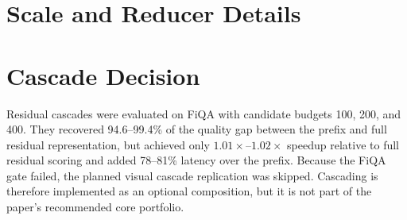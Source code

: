 \documentclass{article}
\begin{document}
\section{Scale and Reducer Details}

\begin{center}
\label{tab:scale-exact}
\footnotesize
\resizebox{\linewidth}{!}{}
\end{center}

\begin{center}
\label{tab:reducers-exact}
\footnotesize
\resizebox{\linewidth}{!}{}
\end{center}

\section{Cascade Decision}

Residual cascades were evaluated on FiQA with candidate budgets 100, 200, and
400. They recovered 94.6--99.4\% of the quality gap between the prefix and
full residual representation, but achieved only $1.01\times$--$1.02\times$
speedup relative to full residual scoring and added 78--81\% latency over the
prefix. Because the FiQA gate failed, the planned visual cascade replication
was skipped. Cascading is therefore implemented as an optional composition,
but it is not part of the paper's recommended core portfolio.
\end{document}
